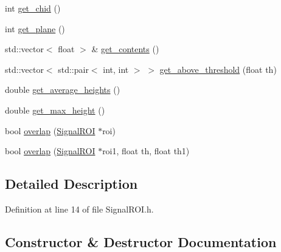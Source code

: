 \begin{DoxyCompactItemize}
\item 
int \hyperlink{class_wire_cell_1_1_sig_proc_1_1_signal_r_o_i_a92565abca22adcc336111be6f487f9c9}{get\+\_\+chid} ()
\item 
int \hyperlink{class_wire_cell_1_1_sig_proc_1_1_signal_r_o_i_ab3dee5cfbcf601f4ac56bc7968c74fda}{get\+\_\+plane} ()
\item 
std\+::vector$<$ float $>$ \& \hyperlink{class_wire_cell_1_1_sig_proc_1_1_signal_r_o_i_aa2fee1613b1c49322cf5d738261cf1c9}{get\+\_\+contents} ()
\item 
std\+::vector$<$ std\+::pair$<$ int, int $>$ $>$ \hyperlink{class_wire_cell_1_1_sig_proc_1_1_signal_r_o_i_ad7adf2e8940e21c808371578e16eeac8}{get\+\_\+above\+\_\+threshold} (float th)
\item 
double \hyperlink{class_wire_cell_1_1_sig_proc_1_1_signal_r_o_i_aed20acd4564c60d6ebfc1d0c0b3c27b6}{get\+\_\+average\+\_\+heights} ()
\item 
double \hyperlink{class_wire_cell_1_1_sig_proc_1_1_signal_r_o_i_a32fab4e24000404a740a19813892e105}{get\+\_\+max\+\_\+height} ()
\item 
bool \hyperlink{class_wire_cell_1_1_sig_proc_1_1_signal_r_o_i_a2b79f88f3551f06ccb3f61aaa00da118}{overlap} (\hyperlink{class_wire_cell_1_1_sig_proc_1_1_signal_r_o_i}{Signal\+R\+OI} $\ast$roi)
\item 
bool \hyperlink{class_wire_cell_1_1_sig_proc_1_1_signal_r_o_i_af714fd2a4bba4597bea27d2ab34f0d8d}{overlap} (\hyperlink{class_wire_cell_1_1_sig_proc_1_1_signal_r_o_i}{Signal\+R\+OI} $\ast$roi1, float th, float th1)
\end{DoxyCompactItemize}


\subsection{Detailed Description}


Definition at line 14 of file Signal\+R\+O\+I.\+h.



\subsection{Constructor \& Destructor Documentation}
\mbox{\label{class_wire_cell_1_1_sig_proc_1_1_signal_r_o_i_ab8d07b50d3925529673ce79238ab0480}} 
